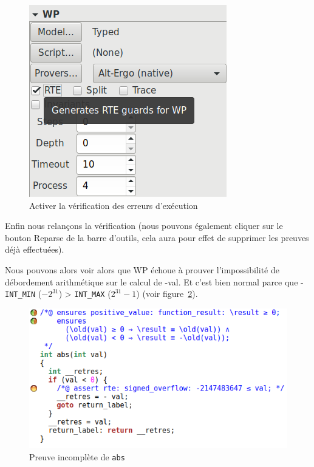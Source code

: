 \documentclass[12pt,francais,]{scrbook}
\begin{document}
\begin{figure}[htbp]
\centering
\includegraphics[scale=0.5]{2-1-1-abs-3.png}
\caption{Activer la vérification des erreurs d'exécution}
\label{fig:2-1-1-abs-3}
\end{figure}

Enfin nous relançons la vérification (nous pouvons également cliquer sur
le bouton \og{}Reparse\fg{} de la barre d'outils, cela aura pour effet de
supprimer les preuves déjà effectuées).

Nous pouvons alors voir alors que WP échoue à prouver l'impossibilité de
débordement arithmétique sur le calcul de -val. Et c'est bien normal
parce que -\texttt{INT\_MIN} (\(-2^{31}\)) \textgreater{}
\texttt{INT\_MAX} (\(2^{31}-1\)) (voir figure~\ref{fig:2-1-1-abs-4}).

\begin{figure}[htbp]
\centering
\includegraphics[scale=0.5]{2-1-1-abs-4.png}
\caption{Preuve incomplète de \texttt{abs}}
\label{fig:2-1-1-abs-4}
\end{figure}
\end{document}
